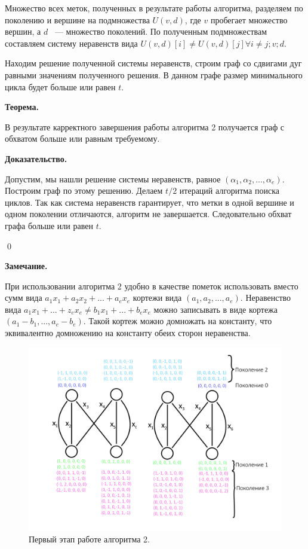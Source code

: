 \documentclass[14pt]{mmcs_article}
\begin{document}
Множество всех меток, полученных в результате работы алгоритма, разделяем по поколению и вершине на подмножества $U(v, d)$, где $v$ пробегает множество вершин, а $d$ ~--- множество поколений. По полученным подмножествам составляем систему неравенств вида $U(v, d)[i] \neq U(v,d)[j] \forall i \neq j; v; d$.

Находим решение полученной системы неравенств, строим граф со сдвигами дуг равными значениям полученного решения. В данном графе размер минимального цикла будет больше или равен $t$. 

\textbf{Теорема.}

В результате карректного завершения работы алгоритма 2 получается граф с обхватом больше или равным требуемому.

\textbf{Доказательство.}

Допустим, мы нашли решение системы неравенств, равное $(\alpha_1, \alpha_2, ..., \alpha_e)$. Построим граф по этому решению. Делаем $t/2$ итераций алгоритма поиска циклов. Так как система неравенств гарантирует, что метки в одной вершине и одном поколении отличаются, алгоритм не завершается. Следовательно обхват графа больше или равен $t$.

\qed

\textbf{Замечание.}

При использовании алгоритма 2 удобно в качестве пометок использовать вместо сумм вида $a_1 x_1 + a_2 x_2 + ... + a_e x_e$ кортежи вида $(a_1, a_2, ..., a_e)$. Неравенство вида $a_1 x_1 + ... + z_e x_e \neq b_1 x_1 + ... + b_e x_e$ можно записывать в виде кортежа $(a_1 - b_1, ..., a_e - b_e)$. Такой кортеж можно домножать на константу, что эквивалентно домножению на константу обеих сторон неравенства. 

\begin{figure}[H]
  \centering
  \includegraphics[scale=0.5]{Fig_6.png}
  \caption{ Первый этап работе алгоритма 2. }
  \label{stud:fig:6}
\end{figure}
\end{document}
